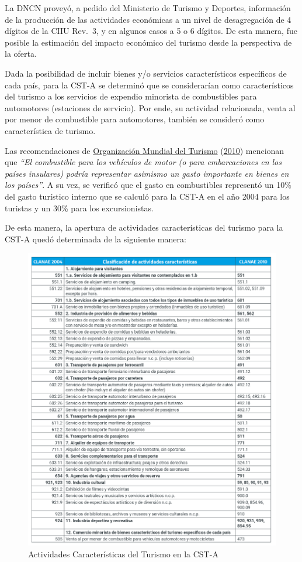 \documentclass[
  openany]{book}
\begin{document}
La DNCN proveyó, a pedido del Ministerio de Turismo y Deportes, información de la producción de las actividades económicas a un nivel de desagregación de 4 dígitos de la CIIU Rev.~3, y en algunos casos a 5 o 6 dígitos. De esta manera, fue posible la estimación del impacto económico del turismo desde la perspectiva de la oferta.

Dada la posibilidad de incluir bienes y/o servicios característicos específicos de cada país, para la CST-A se determinó que se considerarían como característicos del turismo a los servicios de expendio minorista de combustibles para automotores (estaciones de servicio). Por ende, su actividad relacionada, venta al por menor de combustible para automotores, también se consideró como característica de turismo.

Las recomendaciones de \protect\hyperlink{ref-riet2008}{Organización Mundial del Turismo} (\protect\hyperlink{ref-riet2008}{2010}) mencionan que \emph{``El combustible para los vehículos de motor (o para embarcaciones en los países insulares) podría representar asimismo un gasto importante en bienes en los países''}. A su vez, se verificó que el gasto en combustibles representó un 10\% del gasto turístico interno que se calculó para la CST-A en el año 2004 para los turistas y un 30\% para los excursionistas.

De esta manera, la apertura de actividades características del turismo para la CST-A quedó determinada de la siguiente manera:

\begin{figure}

{\centering \includegraphics[width=1\linewidth]{imagenes/figrua1.3} 

}

\caption{Actividades Características del Turismo en la CST-A}\label{fig:activcst}
\end{figure}
\end{document}

